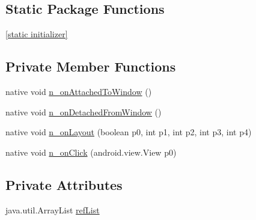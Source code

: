 \subsection*{Static Package Functions}
\begin{CompactItemize}
\item 
\hyperlink{classmd5270abb39e60627f0f200893b490a1ade_1_1_navigation_page_renderer_68a92bc28bda6e25ebce11def38835b7}{\mbox{[}static initializer\mbox{]}}
\end{CompactItemize}
\subsection*{Private Member Functions}
\begin{CompactItemize}
\item 
native void \hyperlink{classmd5270abb39e60627f0f200893b490a1ade_1_1_navigation_page_renderer_afa96226c385d53d071a1041caa0083b}{n\_\-onAttachedToWindow} ()
\item 
native void \hyperlink{classmd5270abb39e60627f0f200893b490a1ade_1_1_navigation_page_renderer_7059010250798b73240f397f59f241e0}{n\_\-onDetachedFromWindow} ()
\item 
native void \hyperlink{classmd5270abb39e60627f0f200893b490a1ade_1_1_navigation_page_renderer_cf8eee3954579f5da6d0ced3acc03357}{n\_\-onLayout} (boolean p0, int p1, int p2, int p3, int p4)
\item 
native void \hyperlink{classmd5270abb39e60627f0f200893b490a1ade_1_1_navigation_page_renderer_60a09228ae4643f98bcda0723fb33099}{n\_\-onClick} (android.view.View p0)
\end{CompactItemize}
\subsection*{Private Attributes}
\begin{CompactItemize}
\item 
java.util.ArrayList \hyperlink{classmd5270abb39e60627f0f200893b490a1ade_1_1_navigation_page_renderer_d437aec87e29f0fb2592513dc48257bd}{refList}
\end{CompactItemize}


